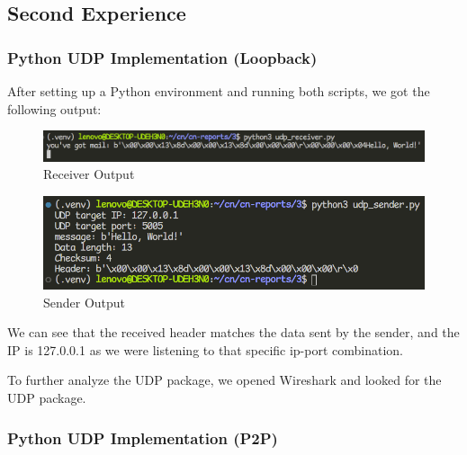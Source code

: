 \subsection{Second Experience}

\subsubsection{Python UDP Implementation (Loopback)}

After setting up a Python environment and running both scripts, we got the
following output:

\begin{figure}[htbp]
	\centering
	\includegraphics[width=1\linewidth]{img/second_exp/1.png}
	\caption{Receiver Output}\label{fig:2_1}
\end{figure}

\begin{figure}[htbp]
	\centering
	\includegraphics[width=1\linewidth]{img/second_exp/2.png}
	\caption{Sender Output}\label{fig:2_2}
\end{figure}

We can see that the received header matches the data sent by the sender, and
the IP is 127.0.0.1 as we were listening to that specific ip-port combination.

To further analyze the UDP package, we opened Wireshark and looked for the UDP package.

\subsubsection{Python UDP Implementation (P2P)}